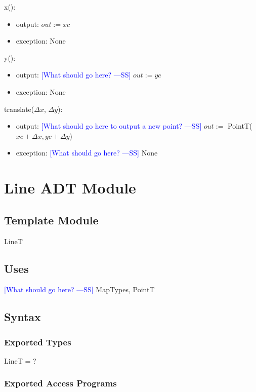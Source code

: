 \documentclass[12pt]{article}
\newcommand{\authornote}[3]{\textcolor{#1}{[#3 ---#2]}}
\newcommand{\authornote}[3]{}
\newcommand{\wss}[1]{\authornote{blue}{SS}{#1}}
\begin{document}
\noindent x():
\begin{itemize}
\item output: $out := xc$
\item exception: None
\end{itemize}

\noindent y():
\begin{itemize}
\item output: \wss{What should go here?} $out := yc$
\item exception: None
\end{itemize}

\noindent translate($\Delta x$, $\Delta y$):
\begin{itemize}
\item output: \wss{What should go here to output a new point?} $out :=$ PointT($xc + \Delta x, yc + \Delta y$)
\item exception: \wss{What should go here?} None
\end{itemize}

\newpage

\section* {Line ADT Module}

\subsection*{Template Module}

LineT

\subsection* {Uses}
\wss{What should go here?} MapTypes, PointT

\subsection* {Syntax}

\subsubsection* {Exported Types}

LineT = ?

\subsubsection* {Exported Access Programs}
\end{document}
